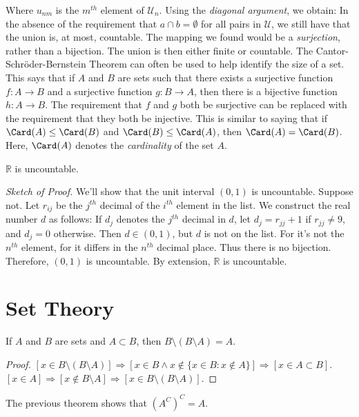         Where $u_{nm}$ is the $m^{th}$ element of
        $\mathcal{U}_{n}$.
        Using the \textit{diagonal argument},
        we obtain:
        In the absence of the requirement that
        $a\cap{b}=\emptyset$ for all pairs in $\mathcal{U}$,
        we still have that the union is, at most, countable.
        The mapping we found would be a
        \textit{surjection}, rather than a bijection.
        The union is then either finite or countable. The
        Cantor-Schr\"{o}der-Bernstein Theorem can often be
        used to help identify the size of a set. This says
        that if $A$ and $B$ are sets such that there exists
        a surjective function $f:A\rightarrow{B}$ and a
        surjective function $g:B\rightarrow{A}$, then there
        is a bijective function $h:A\rightarrow{B}$. The
        requirement that $f$ and $g$ both be surjective
        can be replaced with the requirement that they both
        be injective. This is similar to saying that if
        $\Card(A)\leq\Card(B)$ and $\Card(B)\leq\Card(A)$,
        then $\Card(A)=\Card(B)$. Here, $\Card(A)$ denotes
        the \textit{cardinality} of the set $A$.
        \begin{theorem}
            $\mathbb{R}$ is uncountable.
        \end{theorem}
        \textit{Sketch of Proof.} We'll show that the unit
        interval $(0,1)$ is uncountable. Suppose not.
        Let $r_{ij}$ be the $j^{th}$ decimal of the $i^{th}$
        element in the list. We construct the real number
        $d$ as follows: If $d_{j}$ denotes the $j^{th}$
        decimal in $d$, let $d_{j}=r_{jj}+1$ if
        $r_{jj}\ne{9}$, and $d_{j}=0$ otherwise. Then
        $d\in(0,1)$, but $d$ is not on the list. For it's not
        the $n^{th}$ element, for it differs in the
        $n^{th}$ decimal place. Thus there is no bijection.
        Therefore, $(0,1)$ is uncountable. By extension,
        $\mathbb{R}$ is uncountable.
    \section{Set Theory}
        \begin{theorem}
            If $A$ and $B$ are sets and $A\subset B$,
            then $B\setminus(B\setminus A)=A$.
        \end{theorem}
        \begin{proof}
            $[x\in B\setminus(B\setminus{A})]%
             \Rightarrow[x\in{B}\land{x}\notin%
             \{x\in{B}:x\notin{A}\}]%
             \Rightarrow[x\in{A}\subset{B}]$.
             $[x\in{A}]\Rightarrow[x\notin{B}\setminus{A}]%
             \Rightarrow[x\in{B}\setminus(B\setminus{A})]$.
        \end{proof}
        The previous theorem shows that $(A^C)^{C}=A$.
